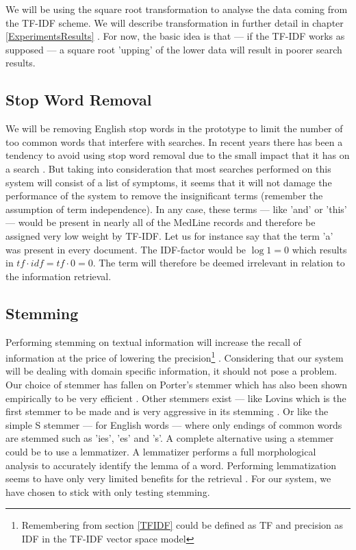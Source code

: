 We will be using the square root transformation to analyse the data
coming from the TF-IDF scheme. We will describe transformation in
further detail in chapter \ref{ExperimentsResults} . For now, the basic idea is that --- if the TF-IDF
works as supposed --- a square root 'upping' of the lower data will
result in poorer search results.

\subsection{Stop Word Removal}

We will be removing English stop words in the prototype to limit the
number of too common words that interfere with searches. In recent
years there has been a tendency to avoid using stop word removal due
to the small impact that it has on a search \cite{IntroIR2009}. But
taking into consideration that most searches performed on this system
will consist of a list of symptoms, it seems that it will not damage
the performance of the system to remove the insignificant terms
(remember the assumption of term independence). In any case, these
terms --- like 'and' or 'this' --- would be present in nearly all of
the MedLine records and therefore be assigned very low weight by
TF-IDF. Let us for instance say that the term 'a' was present in every
document. The IDF-factor would be $\log 1 = 0$ which results in
$\mathit{tf} \cdot \mathit{idf} = \mathit{tf} \cdot 0 = 0$. The term
will therefore be deemed irrelevant in relation to the information
retrieval.

\subsection{Stemming}

Performing stemming on textual information will increase the recall of
information at the price of lowering the
precision\footnote{Remembering from section \ref{TFIDF} could be
  defined as TF and precision as IDF in the TF-IDF vector space model}
\cite{IntroIR2009}. Considering that our system will be dealing with
domain specific information, it should not pose a problem. Our choice
of stemmer has fallen on Porter's stemmer which has also been shown
empirically to be very efficient \cite{IntroIR2009}. Other stemmers
exist --- like Lovins which is the first stemmer to be made and is
very aggressive in its stemming \cite{Kurz2002309}. Or like the simple
S stemmer --- for English words --- where only endings of common words
are stemmed such as 'ies', 'es' and 's'. A complete alternative using
a stemmer could be to use a lemmatizer. A lemmatizer performs a full
morphological analysis to accurately identify the lemma of a word. Performing
lemmatization seems to have only very limited benefits for the
retrieval \cite{IntroIR2009}. For our system, we have chosen to stick with only
testing stemming.

